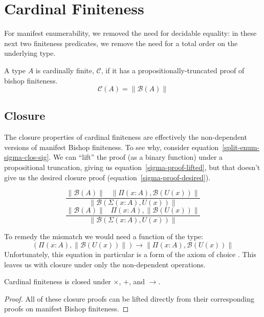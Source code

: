 \section{Cardinal Finiteness} \label{cardinal}
For manifest enumerability, we removed the need for decidable equality: in these
next two finiteness predicates, we remove the need for a total order on the
underlying type.
\begin{rm-definition}
  A type \(A\) is cardinally finite, \(\mathcal{C}\), if it has a
  propositionally-truncated proof of bishop finiteness.
  \begin{equation}
    \mathcal{C}(A) = \lVert \mathcal{B}(A) \rVert
  \end{equation}%
\end{rm-definition}%
\subsection{Closure}
The closure properties of cardinal finiteness are effectively the non-dependent
versions of manifest Bishop finiteness.
To see why, consider equation~\ref{split-enum-sigma-clos-sig}.
We can ``lift'' the proof (as a binary function) under a propositional
truncation, giving us equation~\ref{sigma-proof-lifted}, but that doesn't give us
the desired closure proof (equation~\ref{sigma-proof-desired}).
\begin{multicols}{2}
  \noindent
  \begin{equation} \label{sigma-proof-lifted}
    \frac{
      \lVert \mathcal{B}(A) \rVert \; \; \; \lVert \Pi (x : A) , \mathcal{B}(U(x)) \rVert
    }{
      \lVert \mathcal{B}(\Sigma(x : A) , U(x)) \rVert
    }
  \end{equation}
  \begin{equation} \label{sigma-proof-desired}
    \frac{
      \lVert \mathcal{B}(A) \rVert \; \; \; \Pi (x : A) , \lVert \mathcal{B}(U(x))  \rVert
    }{
      \lVert \mathcal{B}(\Sigma(x : A) , U(x)) \rVert
    }
  \end{equation}
\end{multicols}%
To remedy the mismatch we would need a function of the type:
\begin{equation}
  \left( \Pi(x : A) , \lVert \mathcal{B}(U(x)) \rVert \right) \rightarrow
  \lVert \Pi(x : A) , \mathcal{B}(U(x)) \rVert
\end{equation}
Unfortunately, this equation in particular is a form of the axiom of choice
\cite[equation 3.8.3]{hottbook}.
This leaves us with closure under only the non-dependent operations.
\begin{rm-lemma}
  Cardinal finiteness is closed under \(\times\), \(+\), and \(\rightarrow\).
\end{rm-lemma}
\begin{proof}
  All of these closure proofs can be lifted directly from their corresponding
  proofs on manifest Bishop finiteness.
\end{proof}
